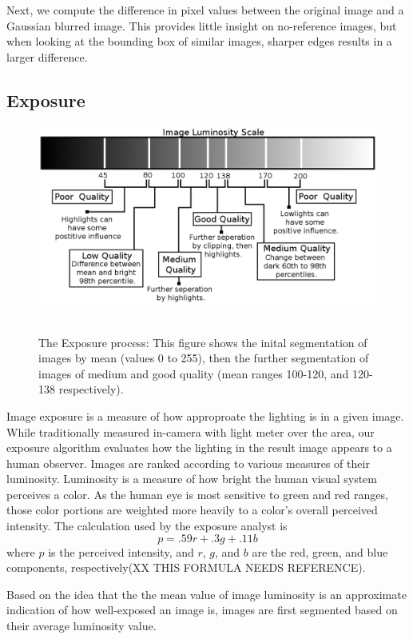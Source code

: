\documentclass{article}
\begin{document}
Next, we compute the difference in pixel values between the original image and a Gaussian blurred image. This provides little insight on no-reference images, but when looking at the bounding box of similar images, sharper edges results in a larger difference.

\subsection{Exposure}
\begin{figure}[t]
  \centering
    \includegraphics[scale=0.53,clip]{imageluminosity.eps}\
    \label{exposurefigure}
  \caption{The Exposure process: This figure shows the inital segmentation of images by mean (values 0 to 255), then the further segmentation of images of medium and good quality (mean ranges 100-120, and 120-138 respectively).}
\end{figure}
Image exposure is a measure of how approproate the lighting is in a given image.  While traditionally measured in-camera with light meter over the area, our exposure algorithm evaluates how the lighting in the result image appears to a human observer.  Images are ranked according to various measures of their luminosity.  Luminosity is a measure of how bright the human visual system perceives a color. As the human eye is most sensitive to green and red ranges, those color portions are weighted more heavily to a color's overall perceived intensity. The calculation used by the exposure analyst is
\[
p=.59r+.3g+.11b
\]
where \(p\) is the perceived intensity, and \(r\), \(g\), and \(b\) are the red, green, and blue components, respectively(XX THIS FORMULA NEEDS REFERENCE).

Based on the idea that the the mean value of image luminosity is an approximate indication of how well-exposed an image is, images are first segmented based on their average luminosity value.
\end{document}

